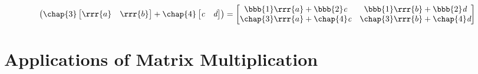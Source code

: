 \begin{itemize}
\begin{itemize}
\[\begin{pmatrix}
    \chap{3} \begin{bmatrix} \rrr{a} & \rrr{b} \end{bmatrix} + 
    \chap{4} \begin{bmatrix} \emph{c} & \emph{d} \end{bmatrix}
    \end{pmatrix}
    =
    \begin{bmatrix}
      \bbb{1}\rrr{a} + \bbb{2}\emph{c} & \bbb{1}\rrr{b}+\bbb{2}\emph{d} \\ \chap{3}\rrr{a}+\chap{4}\emph{c} & \chap{3}\rrr{b}+\chap{4}\emph{d} 
    \end{bmatrix}
  \]%
  \end{itemize}
\end{itemize}

\section{Applications of Matrix Multiplication}\label{Applications of Matrix Multiplication}
